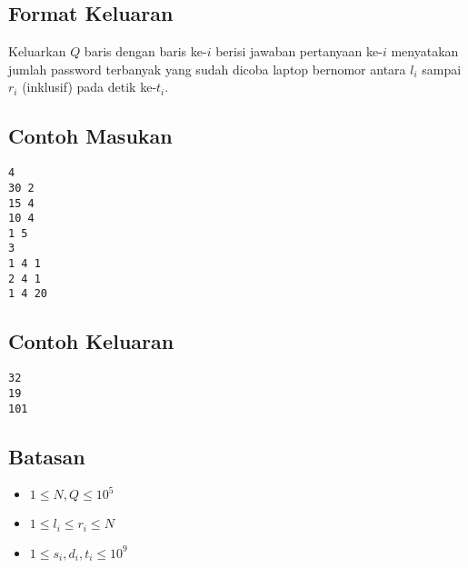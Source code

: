 \documentclass{article}
\begin{document}
\subsection*{Format Keluaran}

\par\noindent Keluarkan $Q$ baris dengan baris ke-$i$ berisi jawaban pertanyaan ke-$i$ menyatakan jumlah password terbanyak yang sudah dicoba laptop bernomor antara $l_i$ sampai $r_i$ (inklusif) pada detik ke-$t_i$.

\subsection*{Contoh Masukan}

\begin{lstlisting}
4
30 2
15 4
10 4
1 5
3
1 4 1
2 4 1
1 4 20
\end{lstlisting}

\subsection*{Contoh Keluaran}

\begin{lstlisting}
32
19
101
\end{lstlisting}

\subsection*{Batasan}

\begin{itemize}
  \item $1 \leq N, Q \leq 10^5$
  \item $1 \leq l_i \leq r_i \leq N$
  \item $1 \leq s_i, d_i, t_i \leq 10^9$
\end{itemize}
\end{document}
